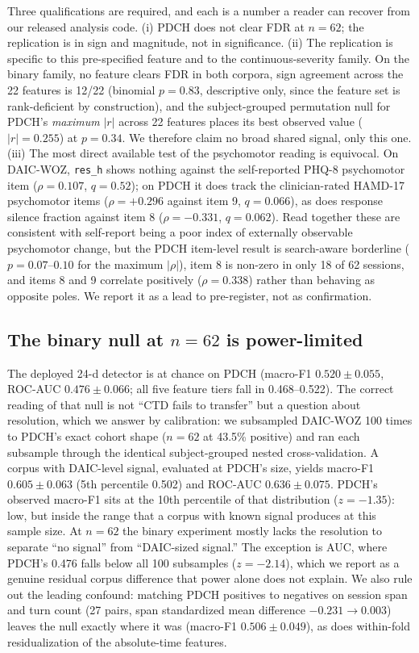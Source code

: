 \documentclass{article}
\begin{document}
Three qualifications are required, and each is a number a reader can recover from our released analysis code. (i) PDCH does not clear FDR at $n{=}62$; the replication is in sign and magnitude, not in significance. (ii) The replication is specific to this pre-specified feature and to the continuous-severity family. On the binary family, no feature clears FDR in both corpora, sign agreement across the 22 features is 12/22 (binomial $p = 0.83$, descriptive only, since the feature set is rank-deficient by construction), and the subject-grouped permutation null for PDCH's \emph{maximum} $|r|$ across 22 features places its best observed value ($|r| = 0.255$) at $p = 0.34$. We therefore claim no broad shared signal, only this one. (iii) The most direct available test of the psychomotor reading is equivocal. On DAIC-WOZ, \texttt{res\_h} shows nothing against the self-reported PHQ-8 psychomotor item ($\rho = 0.107$, $q = 0.52$); on PDCH it does track the clinician-rated HAMD-17 psychomotor items ($\rho = +0.296$ against item 9, $q = 0.066$), as does response silence fraction against item 8 ($\rho = -0.331$, $q = 0.062$). Read together these are consistent with self-report being a poor index of externally observable psychomotor change, but the PDCH item-level result is search-aware borderline ($p = 0.07$--$0.10$ for the maximum $|\rho|$), item 8 is non-zero in only 18 of 62 sessions, and items 8 and 9 correlate positively ($\rho = 0.338$) rather than behaving as opposite poles. We report it as a lead to pre-register, not as confirmation.

\subsection{The binary null at $n{=}62$ is power-limited}
\label{sec:audit-power}
The deployed 24-d detector is at chance on PDCH (macro-F1 $0.520 \pm 0.055$, ROC-AUC $0.476 \pm 0.066$; all five feature tiers fall in 0.468--0.522). The correct reading of that null is not ``CTD fails to transfer'' but a question about resolution, which we answer by calibration: we subsampled DAIC-WOZ 100 times to PDCH's exact cohort shape ($n{=}62$ at 43.5\% positive) and ran each subsample through the identical subject-grouped nested cross-validation. A corpus with DAIC-level signal, evaluated at PDCH's size, yields macro-F1 $0.605 \pm 0.063$ (5th percentile 0.502) and ROC-AUC $0.636 \pm 0.075$. PDCH's observed macro-F1 sits at the 10th percentile of that distribution ($z = -1.35$): low, but inside the range that a corpus with known signal produces at this sample size. At $n{=}62$ the binary experiment mostly lacks the resolution to separate ``no signal'' from ``DAIC-sized signal.'' The exception is AUC, where PDCH's 0.476 falls below all 100 subsamples ($z = -2.14$), which we report as a genuine residual corpus difference that power alone does not explain. We also rule out the leading confound: matching PDCH positives to negatives on session span and turn count (27 pairs, span standardized mean difference $-0.231 \rightarrow 0.003$) leaves the null exactly where it was (macro-F1 $0.506 \pm 0.049$), as does within-fold residualization of the absolute-time features.
\end{document}
